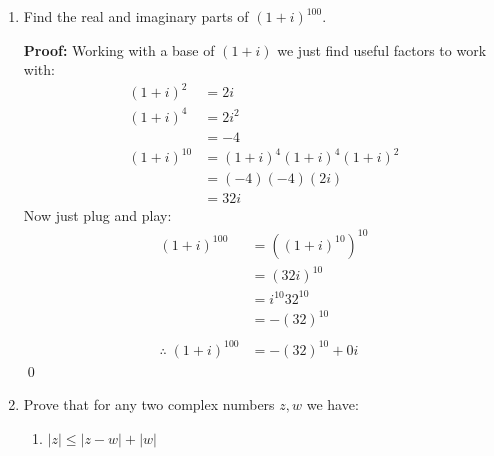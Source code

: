 \begin{enumerate}
\begin{enumerate}
		            Next, think of whether part of $\alpha$ along just the real part or that part plus
		            another would always make it larger than or equal to? If they always have the same
		            imaginary part, then adding a real only increases the size of $\alpha$ while leaving
		            the imaginary part at its maximum value. I'm too lazy to type this out right now, maybe later.
		            \qed
	      \end{enumerate}

	\item Find the real and imaginary parts of $(1 + i)^{100}.$

	      \textbf{Proof:}
	      Working with a base of $(1 + i)$ we just find useful factors to work with:
	      \begin{align*}
		      (1 + i)^2    & = 2i                          \\
		      (1 + i)^4    & = 2i^2                        \\
		                   & = -4                          \\
		      (1 + i)^{10} & = (1 + i)^4(1 + i)^4(1 + i)^2 \\
		                   & = (-4)(-4)(2i)                \\
		                   & = 32i
	      \end{align*}
	      Now just plug and play:
	      \begin{align*}
		      (1 + i)^{100}               & = ((1 + i)^{10})^{10} \\
		                                  & = (32i)^{10}          \\
		                                  & = i^{10}32^{10}       \\
		                                  & = -(32)^{10}          \\
		      \\
		      \therefore \; (1 + i)^{100} & = -(32)^{10} +0i
	      \end{align*}
	      \qed


	\item Prove that for any two complex numbers $z, w$ we have:
	      \begin{enumerate}
		      \item $|z| \leq |z - w| + |w|$


\end{enumerate}
\end{enumerate}
